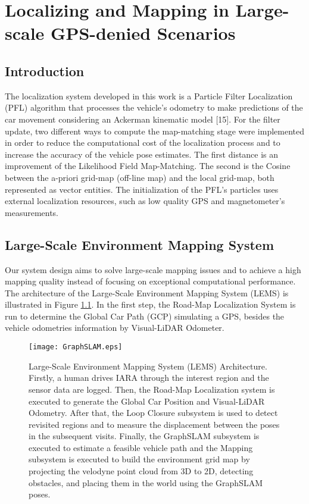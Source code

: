 \chapter{Localizing and Mapping in Large-scale GPS-denied Scenarios}

\section{Introduction}

The localization system developed in this work is a Particle Filter Localization (PFL) algorithm that processes the vehicle's odometry to make predictions of the car movement considering an Ackerman kinematic model [15]. For the filter update, two different ways to compute the map-matching stage were implemented in order to reduce the computational cost of the localization process and to increase the accuracy of the vehicle pose estimates. The first distance is an improvement of the Likelihood Field Map-Matching. The second is the Cosine between the a-priori grid-map (off-line map) and the local grid-map, both represented as vector entities. The initialization of the PFL's particles uses external localization resources, such as low quality GPS and magnetometer's measurements.

\section{Large-Scale Environment Mapping System}
\label{sec:Mapping}

Our system design aims to solve large-scale mapping issues and to achieve a high mapping quality instead of focusing on exceptional computational performance. The architecture of the Large-Scale Environment Mapping System (LEMS) is illustrated in Figure \ref{Fig::FIGURE02}. In the first step, the Road-Map Localization System is run to determine the Global Car Path (GCP) simulating a GPS, besides the vehicle odometries information by Visual-LiDAR Odometer. 


\begin{figure}[ht]
    \centering
    \texttt{[image: GraphSLAM.eps]}
    \caption{Large-Scale Environment Mapping System (LEMS) Architecture. Firstly, a human drives IARA through the interest region and the sensor data are logged. Then, the Road-Map Localization system is executed to generate the Global Car Position and Visual-LiDAR Odometry. After that, the Loop Closure subsystem is used to detect revisited regions and to measure the displacement between the poses in the subsequent visits. Finally, the GraphSLAM subsystem is executed to estimate a feasible vehicle path and the Mapping subsystem is executed to build the environment grid map by projecting the velodyne point cloud from 3D to 2D, detecting obstacles, and placing them in the world using the GraphSLAM poses.}
    \label{Fig::FIGURE02}
\end{figure}

